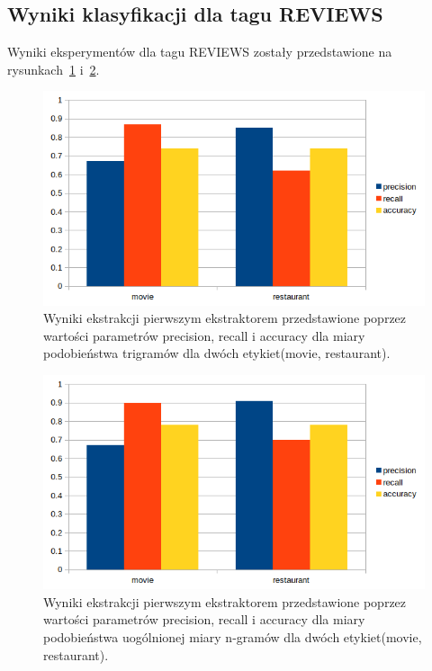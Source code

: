 \documentclass{classrep}
\begin{document}
\subsection{Wyniki klasyfikacji dla tagu REVIEWS}
Wyniki eksperymentów dla tagu REVIEWS zostały przedstawione na rysunkach~\ref{fig:REVIEWS1} i~\ref{fig:REVIEWS2}.\\
\begin{figure}[H]
  \includegraphics[width=\linewidth]{wykresy/1ext2tagNG_precrecacc.png}
  \caption{Wyniki ekstrakcji pierwszym ekstraktorem przedstawione poprzez wartości parametrów precision, recall i accuracy dla miary podobieństwa trigramów dla dwóch etykiet(movie, restaurant).}
  \label{fig:REVIEWS1}
\end{figure}
\newpage
\begin{figure}[H]
  \includegraphics[width=\linewidth]{wykresy/2ext2tagGNG_precrecall.png}
  \caption{Wyniki ekstrakcji pierwszym ekstraktorem przedstawione poprzez wartości parametrów precision, recall i accuracy dla miary podobieństwa uogólnionej miary n-gramów dla dwóch etykiet(movie, restaurant).}
  \label{fig:REVIEWS2}
\end{figure}
\end{document}
